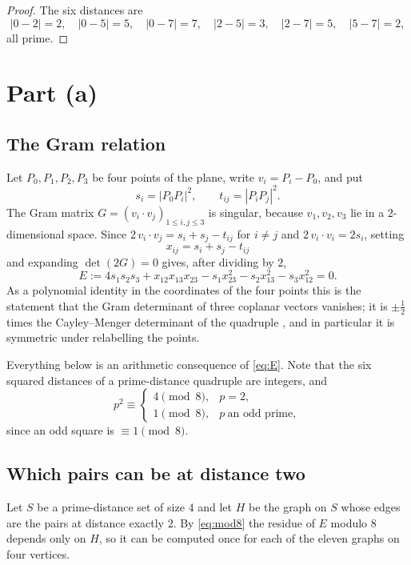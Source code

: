 \documentclass[11pt]{article}
\theoremstyle{plain}
\theoremstyle{definition}
\theoremstyle{remark}
\begin{document}
\begin{proof}
The six distances are
\[
  |0-2|=2,\quad |0-5|=5,\quad |0-7|=7,\quad
  |2-5|=3,\quad |2-7|=5,\quad |5-7|=2,
\]
all prime. \end{proof}

\section{Part (a)}

\subsection{The Gram relation}

Let $P_0,P_1,P_2,P_3$ be four points of the plane, write $v_i=P_i-P_0$, and put
\[
  s_i=|P_0P_i|^2,\qquad t_{ij}=|P_iP_j|^2 .
\]
The Gram matrix $G=(v_i\cdot v_j)_{1\le i,j\le3}$ is singular, because
$v_1,v_2,v_3$ lie in a $2$-dimensional space. Since
$2\,v_i\cdot v_j=s_i+s_j-t_{ij}$ for $i\ne j$ and $2\,v_i\cdot v_i=2s_i$,
setting
\[
  x_{ij}=s_i+s_j-t_{ij}
\]
and expanding $\det(2G)=0$ gives, after dividing by $2$,
\begin{equation}\label{eq:E}
  E:=4s_1s_2s_3+x_{12}x_{13}x_{23}
     -s_1x_{23}^2-s_2x_{13}^2-s_3x_{12}^2=0 .
\end{equation}
As a polynomial identity in the coordinates of the four points this is the
statement that the Gram determinant of three coplanar vectors vanishes; it is
$\pm\frac12$ times the Cayley--Menger determinant of the quadruple
\cite{Blumenthal}, and in particular it is symmetric under relabelling the
points.

Everything below is an arithmetic consequence of \eqref{eq:E}. Note that the six
squared distances of a prime-distance quadruple are integers, and
\begin{equation}\label{eq:mod8}
  p^2\equiv
  \begin{cases}
    4 \pmod 8, & p=2,\\
    1 \pmod 8, & p\ \text{an odd prime},
  \end{cases}
\end{equation}
since an odd square is $\equiv1\pmod 8$.

\subsection{Which pairs can be at distance two}

Let $S$ be a prime-distance set of size $4$ and let $H$ be the graph on $S$
whose edges are the pairs at distance exactly $2$. By \eqref{eq:mod8} the
residue of $E$ modulo $8$ depends only on $H$, so it can be computed once for
each of the eleven graphs on four vertices.
\end{document}
